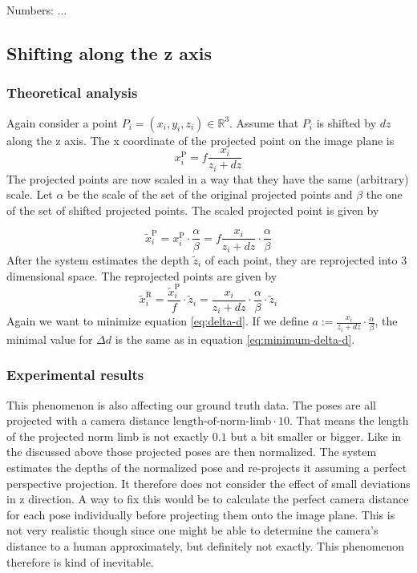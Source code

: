\documentclass[11pt]{article}
\begin{document}
		Numbers: ...
		
	\subsection{Shifting along the z axis}
	\label{sec:z-shift-error}
	\subsubsection{Theoretical analysis}
	Again consider a point $P_i=(x_i, y_i, z_i) \in \mathbb{R}^3$. Assume that $P_i$ is shifted by $dz$ along the z axis.
	The x coordinate of the projected point on the image plane is
	\begin{equation}
		x_i^\mathrm{P} = f \frac{x_i}{z_i + dz}
	\end{equation}
	The projected points are now scaled in a way that they have the same (arbitrary) scale.  Let $\alpha$ be the scale of the set of the original projected points and $\beta$ the one of the set of shifted projected points. The scaled projected point is given by
	
	\begin{equation}
			\widetilde{x}_i^\mathrm{P} = x_i^\mathrm{P} \cdot \frac{\alpha}{\beta} 
			= f \frac{x_i}{z_i + dz}\cdot \frac{\alpha}{\beta} 
	\end{equation}
	After the system estimates the depth $\widetilde{z}_i$ of each point, they are reprojected into 3 dimensional space.
	The reprojected points are given by
	\begin{equation}
		\widetilde{x}_i^\mathrm{R} = \frac{\widetilde{x}_i^\mathrm{P}}{f} \cdot \widetilde{z}_i
		= \frac{x_i}{z_i + dz}\cdot \frac{\alpha}{\beta}  \cdot \widetilde{z}_i
	\end{equation}
	Again we want to minimize equation \eqref{eq:delta-d}.
	If we define $a := \frac{x_i}{z_i + dz}\cdot \frac{\alpha}{\beta}$, the minimal value for $\Delta d$ is the same as in equation \eqref{eq:minimum-delta-d}.
	
	
	\subsubsection{Experimental results}
		This phenomenon is also affecting our ground truth data. The poses are all projected with a camera distance $ \text{length-of-norm-limb} \cdot 10$. 
		That means the length of the projected norm limb is not exactly $0.1$ but a bit smaller or bigger. 
		Like in the discussed above those projected poses are then normalized. 
		The system estimates the depths of the normalized pose and re-projects it assuming a perfect perspective projection. 
		It therefore does not consider the effect of small deviations in z direction.
		A way to fix this would be to calculate the perfect camera distance for each pose individually before projecting them onto the image plane.
		This is not very realistic though since one might be able to determine the camera's distance to a human approximately, but definitely not exactly. This phenomenon therefore is kind of inevitable.
		 
\end{document}
